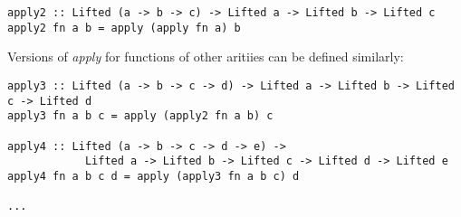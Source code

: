\documentclass[11pt]{article} %
\begin{document}
\begin{exmp}
\begin{verbatim}
apply2 :: Lifted (a -> b -> c) -> Lifted a -> Lifted b -> Lifted c
apply2 fn a b = apply (apply fn a) b
\end{verbatim}

Versions of \emph{apply} for functions of other aritiies  can be defined similarly:

\begin{verbatim}
apply3 :: Lifted (a -> b -> c -> d) -> Lifted a -> Lifted b -> Lifted c -> Lifted d
apply3 fn a b c = apply (apply2 fn a b) c

apply4 :: Lifted (a -> b -> c -> d -> e) -> 
			Lifted a -> Lifted b -> Lifted c -> Lifted d -> Lifted e
apply4 fn a b c d = apply (apply3 fn a b c) d

...
\end{verbatim}

\end{exmp}
\end{document}
